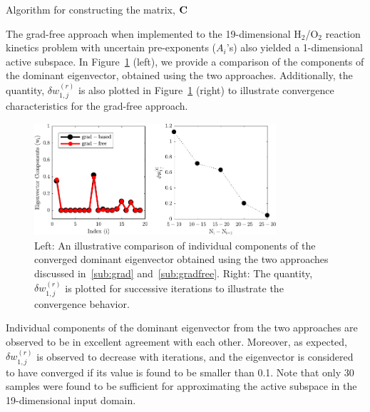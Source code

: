 \bigskip
\begin{breakablealgorithm}
  \caption{Algorithm for constructing the matrix, $\mathbf{{C}}$}
  \begin{algorithmic}[1]
	\EndProcedure
  \end{algorithmic}
  \label{alg:free2}
\end{breakablealgorithm}
\bigskip

The grad-free approach when implemented to the 19-dimensional H$_2$/O$_2$ reaction kinetics problem
with uncertain pre-exponents ($A_i$'s) also yielded a 1-dimensional active subspace. In Figure~\ref{fig:comp} (left),
we provide a comparison of the components of the dominant eigenvector, obtained using the two approaches.
Additionally, the quantity, $\delta w_{1,j}^{(r)}$ is also plotted in
Figure~\ref{fig:comp} (right) to illustrate convergence characteristics for the grad-free approach.
%
\begin{figure}[htbp]
 \begin{center}
  \includegraphics[width=0.8\textwidth]{./Figures/eigv6}
\caption{Left: An illustrative comparison of individual components of the converged dominant eigenvector obtained
using the two approaches discussed in~\ref{sub:grad} and~\ref{sub:gradfree}. Right: The quantity,  $\delta w_{1,j}^{(r)}$
is plotted for successive iterations to illustrate the convergence behavior.}
\label{fig:comp}
\end{center}
\end{figure}
%
Individual components of the dominant eigenvector from the two approaches are observed to be in excellent
agreement with each other. Moreover, as expected,  $\delta w_{1,j}^{(r)}$ is observed to decrease with iterations, and
the eigenvector is considered to have converged if its value is found to be smaller than 0.1. Note that only 30 samples
were found to be sufficient for approximating the active subspace in the 19-dimensional input domain. 

